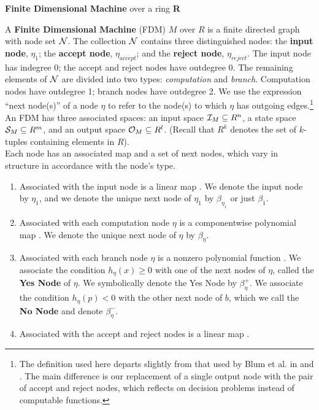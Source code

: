 \begin{definition}{\textbf{Finite Dimensional Machine} over a ring
    \textbf{R}}
  
  A \textbf{Finite Dimensional Machine} (FDM) $M$ over $R$ is a finite
  directed graph with node set $\mathcal{N}$.  The collection $\mathcal{N}$
  contains three distinguished nodes: the \textbf{input node},
  $\eta_1$; the \textbf{accept node}, $\eta_{accept}$; and the
  \textbf{reject node}, $\eta_{reject}$. The input node has indegree 0;
  the accept and reject nodes have outdegree 0.  The remaining
  elements of $\mathcal{N}$ are divided into two types: \emph{computation}
  and \emph{branch}.  Computation nodes have outdegree 1; branch nodes
  have outdegree 2.  We use the expression ``next node(s)'' of a node
  $\eta$ to refer to the node(s) to which $\eta$ has outgoing
  edges.\footnote{The definition used here departs slightly from that
    used by Blum et al. in \cite{B98} and \cite{B89}.  The main
    difference is our replacement of a single output node with the
    pair of accept and reject nodes, which reflects on decision
    problems instead of computable functions.}\\
  
  An FDM has three associated spaces: an input space $\mathcal{I}_M
  \subseteq R^n$, a state space $\mathcal{S}_M \subseteq R^m$, and an
  output space $\mathcal{O}_M \subseteq R^l$.  (Recall that $R^k$
  denotes the set of $k$-tuples containing elements in $R$).\\

  Each node has an associated map and a set of next nodes, which vary
  in structure in accordance with the node's type.

  \begin{enumerate}
  \item Associated with the input node is a linear map
    . We denote the input node
    by $\eta_1$, and we denote the unique next node of $\eta_1$ by
    $\beta_{\eta_1}$ or just $\beta_1$.
    
  \item Associated with each computation node $\eta$ is a
    componentwise polynomial map
    . We denote the
    unique next node of $\eta$ by $\beta_\eta$.
    
  \item Associated with each branch node $\eta$ is a nonzero
    polynomial function .  We
    associate the condition $h_\eta(x) \geq 0$ with one of the next
    nodes of $\eta$, called the \textbf{Yes Node} of $\eta$.  We
    symbolically denote the Yes Node by $\beta_\eta^+$. We associate
    the condition $h_\eta(p) < 0$ with the other next node of $b$,
    which we call the \textbf{No Node} and denote $\beta_\eta^-$.
    
  \item Associated with the accept and reject nodes is a linear map
    .
  \end{enumerate}
\end{definition}

